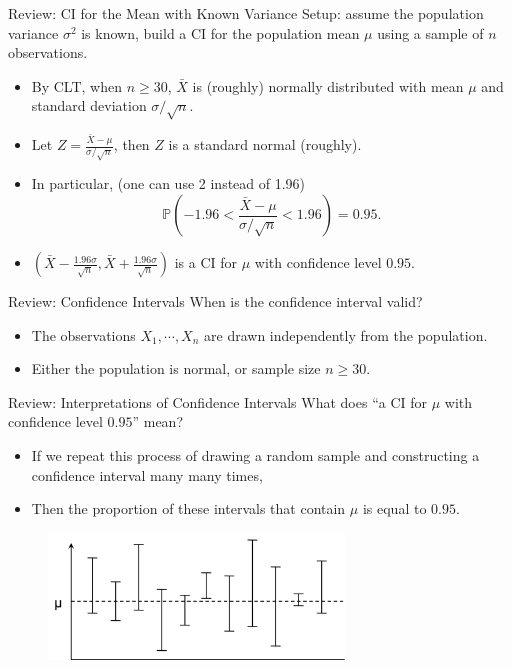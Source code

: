 \documentclass{beamer}
\newcommand{\pr}{\mathbb{P}}
\begin{document}
\begin{frame}{Review: CI for the Mean with Known Variance}
    Setup: assume the population variance $\sigma^2$ is known, build a CI for the population mean $\mu$ using a sample of $n$ observations.

    \begin{itemize}
        \item By CLT, when $n\geq30$, $\bar X$ is (roughly) normally distributed with mean $\mu$ and standard deviation $\sigma/\sqrt{n}$.
        \item Let $Z=\frac{\bar X - \mu}{\sigma/\sqrt{n}}$, then $Z$ is a standard normal (roughly).
        \item In particular, (one can use 2 instead of 1.96)
        $$ \pr(-1.96 < \frac{\bar X - \mu}{\sigma/\sqrt{n}} < 1.96) = 0.95.$$
        \item   $(\bar X - \frac{1.96 \sigma}{\sqrt{n}},\bar X + \frac{1.96 \sigma}{\sqrt{n}})$ is 
        a CI for $\mu$ with confidence level $0.95$.
    \end{itemize}
\end{frame}

\begin{frame}{Review: Confidence Intervals}
When is the confidence interval valid?
\begin{itemize}
\item The observations $X_1,\cdots,X_n$ are drawn independently from the population.
\item Either the population is normal, or sample size $n\geq 30$.
\end{itemize}
\end{frame}

\begin{frame}{Review: Interpretations of Confidence Intervals}
What does  ``a CI for $\mu$ with confidence level $0.95$'' mean?

\begin{itemize}
\item If we repeat this process of drawing a random sample and constructing a confidence interval many many times,
\item Then the proportion of these intervals that contain $\mu$ is equal to $0.95$.
\end{itemize}
\begin{figure}
    \includegraphics[width=0.7\textwidth]{figures/CI.png}
\end{figure}
\end{frame}
\end{document}
